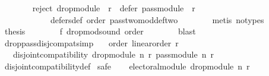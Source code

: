 \begin{isabellebody}
\ \ \ \ \ \ \isamarkupfalse%
\ {\isacartoucheopen}reject\ {\isacharparenleft}{\kern0pt}drop{\isacharunderscore}{\kern0pt}module\ {}\ r{\isacharparenright}{\kern0pt}\ {\isacharequal}{\kern0pt}\ defer\ {\isacharparenleft}{\kern0pt}pass{\isacharunderscore}{\kern0pt}module\ {}\ r{\isacharparenright}{\kern0pt}{\isacartoucheclose}\isanewline
\ \ \ \ \ \ \ \ \ \ \ \ defers{\isacharunderscore}{\kern0pt}def\ order\ pass{\isacharunderscore}{\kern0pt}two{\isacharunderscore}{\kern0pt}mod{\isacharunderscore}{\kern0pt}def{\isacharunderscore}{\kern0pt}two\isanewline
\ \ \ \ \ \ \isamarkupfalse%
\ {\isacharparenleft}{\kern0pt}metis\ {\isacharparenleft}{\kern0pt}no{\isacharunderscore}{\kern0pt}types{\isacharparenright}{\kern0pt}{\isacharparenright}{\kern0pt}\isanewline
\ \ \ \ \isamarkupfalse%
\ {\isacharquery}{\kern0pt}thesis\isanewline
\ \ \ \ \ \ \isamarkupfalse%
\ f{}\ drop{\isacharunderscore}{\kern0pt}mod{\isacharunderscore}{\kern0pt}sound\ order\isanewline
\ \ \ \ \ \ \isamarkupfalse%
\ blast\isanewline
\ \ \isamarkupfalse%
\isanewline
{}\isamarkupfalse%
%
\endisatagproof
{\isafoldproof}%
%
\isadelimproof
\isanewline
%
\endisadelimproof
\isanewline
\isanewline
{}\isamarkupfalse%
\ drop{\isacharunderscore}{\kern0pt}pass{\isacharunderscore}{\kern0pt}disj{\isacharunderscore}{\kern0pt}compat{\isacharbrackleft}{\kern0pt}simp{\isacharbrackright}{\kern0pt}{\isacharcolon}{\kern0pt}\isanewline
\ \ \ order{\isacharcolon}{\kern0pt}\ {\isachardoublequoteopen}linear{\isacharunderscore}{\kern0pt}order\ r{\isachardoublequoteclose}\isanewline
\ \ \ {\isachardoublequoteopen}disjoint{\isacharunderscore}{\kern0pt}compatibility\ {\isacharparenleft}{\kern0pt}drop{\isacharunderscore}{\kern0pt}module\ n\ r{\isacharparenright}{\kern0pt}\ {\isacharparenleft}{\kern0pt}pass{\isacharunderscore}{\kern0pt}module\ n\ r{\isacharparenright}{\kern0pt}{\isachardoublequoteclose}\isanewline
%
\isadelimproof
\ \ %
\endisadelimproof
%
\isatagproof
{}\isamarkupfalse%
\ disjoint{\isacharunderscore}{\kern0pt}compatibility{\isacharunderscore}{\kern0pt}def\isanewline
{}\isamarkupfalse%
\ {\isacharparenleft}{\kern0pt}safe{\isacharparenright}{\kern0pt}\isanewline
\ \ \isamarkupfalse%
\ {\isachardoublequoteopen}electoral{\isacharunderscore}{\kern0pt}module\ {\isacharparenleft}{\kern0pt}drop{\isacharunderscore}{\kern0pt}module\ n\ r{\isacharparenright}{\kern0pt}{\isachardoublequoteclose}\isanewline

\end{isabellebody}
